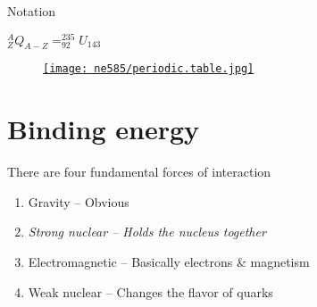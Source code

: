 \documentclass[aspectratio=1610,pdftex,dvipsnames,compress,xcolor={dvipsnames}]{beamer}
\begin{document}
\begin{frame}{Notation}

    \vspace*{\fill}
    
    \centering
    \LARGE
    $^{A}_{Z}Q_{A-Z} = ^{235}_{92}U_{143}$

    \vspace*{\fill}

\end{frame}


\begin{frame}{}
    \begin{figure}
        \centering
        \href{https://ptable.com/}{\texttt{[image: ne585/periodic.table.jpg]}}
    \end{figure}
\end{frame}


\section{Binding energy}


\addtocounter{framenumber}{-1}
\begin{frame}{There are four fundamental forces of interaction}
    \begin{enumerate}[series=outerlist,topsep=0pt,itemsep=21pt,leftmargin=*,label=(\arabic*)]
        \item[]Gravity -- Obvious
        \item[]\textit{Strong nuclear -- Holds the nucleus together}
        \item[]Electromagnetic -- Basically electrons \& magnetism
        \item[]Weak nuclear -- Changes the flavor of quarks
    \end{enumerate}
\end{frame}
\end{document}
